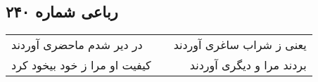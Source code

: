 \begin{center}
\section*{رباعی شماره ۲۴۰}
\label{sec:sh240}
\begin{longtable}{l p{0.5cm} r}
در دیر شدم ماحضری آوردند
&&
یعنی ز شراب ساغری آوردند
\\
کیفیت او مرا ز خود بیخود کرد
&&
بردند مرا و دیگری آوردند
\\
\end{longtable}
\end{center}
